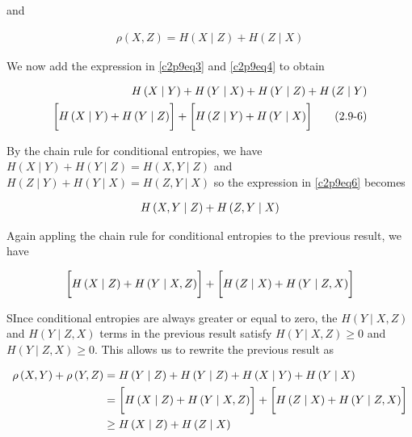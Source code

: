 \documentclass[ClusteringConnectionsMAIN.tex]{subfiles}
\begin{document}
and

\begin{align} \label{c2p9eq5}
\rho \left( X, Z \right) = H \left( X \mid Z \right)+ H \left( Z \mid X \right)  \tag{2.9-5}
\end{align}

We now add the expression in \ref{c2p9eq3} and \ref{c2p9eq4} to obtain

\begin{align} \label{c2p9eq6}
H \left( X \mid Y \right)+ H \left( Y \mid X \right) + H \left( Y \mid Z \right)+ H \left( Z \mid Y \right)  \notag \\
\biggl[ H \left( X \mid Y \right) + H \left( Y \mid Z \right) \biggr] + \biggl[ H \left( Z \mid Y \right) + H \left( Y \mid X \right) \biggr]  \tag{2.9-6}
\end{align}

By the chain rule for conditional entropies, we have $H \left( X \mid Y \right) + H \left( Y \mid Z \right) = H \left( X, Y \mid Z \right)$ and $H \left( Z \mid Y \right) + H \left( Y \mid X \right) = H \left( Z, Y \mid X \right)$ so the expression in \ref{c2p9eq6} becomes

\begin{align} 
H \left( X, Y \mid Z \right) + H \left( Z, Y \mid X \right)  \notag
\end{align}

Again appling the chain rule for conditional entropies to the previous result, we have

\begin{align} 
\biggl[ H \left( X \mid Z \right) + H \left( Y \mid X, Z \right) \biggr] + \biggl[ H \left( Z \mid X \right) + H \left( Y \mid Z, X \right) \biggr]   \notag
\end{align}

SInce conditional entropies are always greater or equal to zero, the $H \left( Y \mid X, Z \right)$ and $H \left( Y \mid Z, X \right)$ terms in the previous result satisfy $H \left( Y \mid X, Z \right) \geq 0$ and $H \left( Y \mid Z, X \right) \geq 0$.  This allows us to rewrite the previous result as

\begin{align} 
\rho \left( X, Y \right) + \rho \left( Y, Z \right) &= H \left( Y \mid Z \right)+ H \left( Y \mid Z \right) +  H \left( X \mid Y \right)+ H \left( Y \mid X \right)  \notag \\
&= \biggl[ H \left( X \mid Z \right) + H \left( Y \mid X, Z \right) \biggr] + \biggl[ H \left( Z \mid X \right) + H \left( Y \mid Z, X \right) \biggr] \notag \\
&\geq H \left( X \mid Z \right) + H \left( Z\mid X \right) \notag 
\end{align}
\end{document}
